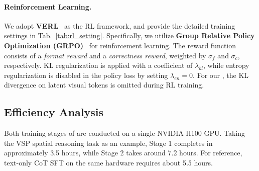 \paragraph{Reinforcement Learning.}
We adopt \textbf{VERL}~\cite{sheng2024hybridflow} as the RL framework, and provide the detailed training settings in Tab.~\ref{tab:rl_setting}. Specifically, we utilize \textbf{Group Relative Policy Optimization (GRPO)}~\cite{shao2024deepseekmath} for reinforcement learning. The reward function consists of a \textit{format reward} and a \textit{correctness reward}, weighted by $\sigma_f$ and $\sigma_c$, respectively. KL regularization is applied with a coefficient of $\lambda_{kl}$, while entropy regularization is disabled in the policy loss by setting $\lambda_{en} = 0$. For our \Model, the KL divergence on latent visual tokens is omitted during RL training.





\subsection{Efficiency Analysis}

Both training stages of \Model are conducted on a single NVIDIA H100 GPU. Taking the VSP spatial reasoning task as an example, Stage 1 completes in approximately 3.5 hours, while Stage 2 takes around 7.2 hours. For reference, text-only CoT SFT on the same hardware requires about 5.5 hours.


